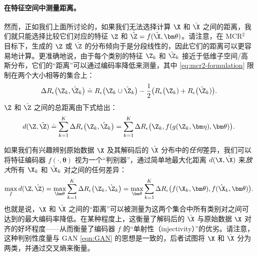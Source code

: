 \documentclass[../../book-main_zh.tex]{subfiles}
\begin{document}
\paragraph{在特征空间中测量距离。}
然而，正如我们上面所讨论的，如果我们无法选择计算 $\X$ 和 $\hat \X$ 之间的距离，我们就只能选择比较它们对应的特征 $\Z$ 和 $\hat \Z =
f(\hat \X, \bm \theta)$。请注意，在 MCR$^2$ 目标下，生成的 $\Z$ 或 $\hat \Z$ 的分布倾向于是分段线性的，因此它们的距离可以更容易地计算。更准确地说，由于每个类别的特征 $\Z_k$ 和 $\hat{\Z}_k$ 接近于低维子空间/高斯分布，它们的“距离”可以通过编码率降低来测量，其中 \eqref{eq:mcr2-formulation} 限制在两个大小相等的集合上：
\begin{equation}
    \Delta R_\epsilon\big(\Z_k, \hat{\Z}_k\big) \doteq
    R_\epsilon\big(\Z_k \cup \hat{\Z}_k\big) - \frac{1}{2} \big(
    R_\epsilon\big(\Z_k) + R_\epsilon\big(\hat \Z_k)\big).
\end{equation}
$\Z$ 和 $\hat \Z$ 之间的总距离由下式给出：
\begin{equation}
    d(\Z, \hat \Z) \doteq   \sum_{k=1}^K \Delta R_\epsilon\big(\Z_k,
    \hat{\Z}_k\big) =  \sum_{k=1}^K \Delta R_\epsilon\big(\Z_k,
    f(g(\Z_k, \bm\eta),\bm \theta)\big).
    \label{eqn:Z-distance}
\end{equation}

如果我们有兴趣辨别原始数据 $\X$ 及其解码后的 $\hat \X$ 分布中的{\em 任何}差异，我们可以将特征编码器 $f(\cdot, \bm \theta)$ 视为一个“判别器”，通过简单地最大化距离 $d(\X, \hat \X)$ 来{\em 放大}所有 $\X_k$ 和 $\hat \X_k$ 对之间的任何差异：
\begin{equation}
    \max_f d(\Z, \hat \Z) = \max_{\bm \theta} \sum_{k=1}^K \Delta
    R_\epsilon\big(\Z_k, \hat{\Z}_k\big) = \max_{\bm \theta}
    \sum_{k=1}^K \Delta R_\epsilon\big(f(\X_k,\bm \theta),
    f(\hat{\X}_k,\bm \theta)\big).
    \label{eqn:max-distance}
\end{equation}
也就是说，$\X$ 和 $\hat \X$ 之间的“距离”可以被测量为这两个集合中所有类别对之间可达到的最大编码率降低。在某种程度上，这衡量了解码后的 $\hat \X$ 与原始数据 $\X$ 对齐的好坏程度——从而衡量了编码器 $f$ 的“单射性（injectivity）”的优劣。请注意，这种判别性度量与 GAN \eqref{eqn:GAN} 的思想是一致的，后者试图将 $\X$ 和 $\hat \X$ 分为两类，并通过交叉熵来衡量。
\end{document}
